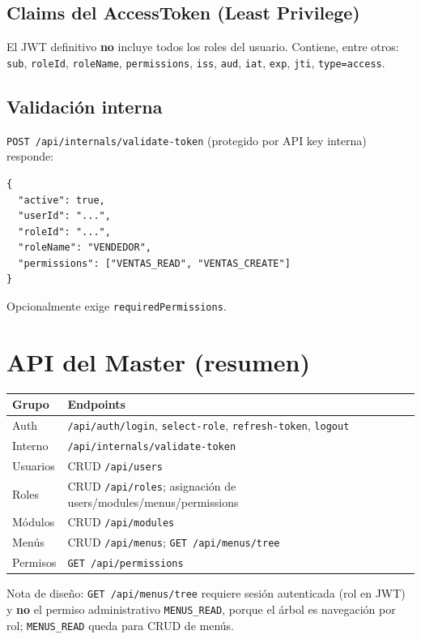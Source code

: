 \documentclass[12pt,a4paper]{article}
\begin{document}
\subsection{Claims del AccessToken (Least Privilege)}
El JWT definitivo \textbf{no} incluye todos los roles del usuario. Contiene, entre otros:
\texttt{sub}, \texttt{roleId}, \texttt{roleName}, \texttt{permissions},
\texttt{iss}, \texttt{aud}, \texttt{iat}, \texttt{exp}, \texttt{jti}, \texttt{type=access}.

\subsection{Validación interna}
\texttt{POST /api/internals/validate-token} (protegido por API key interna) responde:
\begin{lstlisting}
{
  "active": true,
  "userId": "...",
  "roleId": "...",
  "roleName": "VENDEDOR",
  "permissions": ["VENTAS_READ", "VENTAS_CREATE"]
}
\end{lstlisting}
Opcionalmente exige \texttt{requiredPermissions}.

\section{API del Master (resumen)}
\begin{center}
\begin{tabular}{@{}p{6.2cm}p{7.5cm}@{}}
\toprule
\textbf{Grupo} & \textbf{Endpoints} \\
\midrule
Auth &
\texttt{/api/auth/login}, \texttt{select-role}, \texttt{refresh-token}, \texttt{logout} \\
Interno &
\texttt{/api/internals/validate-token} \\
Usuarios &
CRUD \texttt{/api/users} \\
Roles &
CRUD \texttt{/api/roles}; asignación de users/modules/menus/permissions \\
Módulos &
CRUD \texttt{/api/modules} \\
Menús &
CRUD \texttt{/api/menus}; \texttt{GET /api/menus/tree} \\
Permisos &
\texttt{GET /api/permissions} \\
\bottomrule
\end{tabular}
\end{center}

Nota de diseño: \texttt{GET /api/menus/tree} requiere sesión autenticada (rol en JWT)
y \textbf{no} el permiso administrativo \texttt{MENUS\_READ}, porque el árbol es
navegación por rol; \texttt{MENUS\_READ} queda para CRUD de menús.
\end{document}
